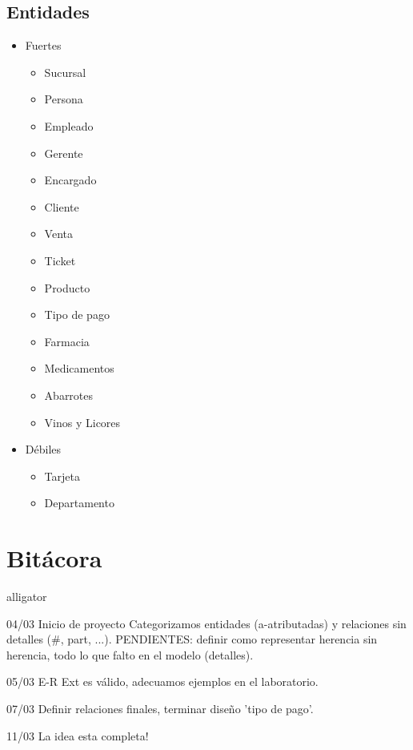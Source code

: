 \documentclass[10pt]{article}
\begin{document}
\subsection{Entidades}
\begin{itemize}
	\item Fuertes
	\begin{itemize}
		\item Sucursal
		\item Persona
		\item Empleado
		\item Gerente
		\item Encargado
		\item Cliente
		\item Venta
		\item Ticket
		\item Producto
		\item Tipo de pago
		\item Farmacia
		\item Medicamentos
		\item Abarrotes 
		\item Vinos y Licores
		
	\end{itemize}
	\item Débiles
	\begin{itemize}
		\item Tarjeta
		\item Departamento
	\end{itemize}
	
\end{itemize}


\section{Bitácora}
	
	\begin{labeling}{alligator}
		\item [04/03] Inicio de proyecto Categorizamos entidades (a-atributadas) y relaciones sin detalles ($\#$, part, ...). PENDIENTES: definir como representar herencia sin herencia, todo lo que falto en el modelo (detalles).
		\item [05/03] E-R Ext es válido, adecuamos ejemplos en el laboratorio. 
		\item [07/03] Definir relaciones finales, terminar diseño 'tipo de pago'.
		\item [11/03] La idea esta completa!
	\end{labeling}
	
	
	
\end{document}
